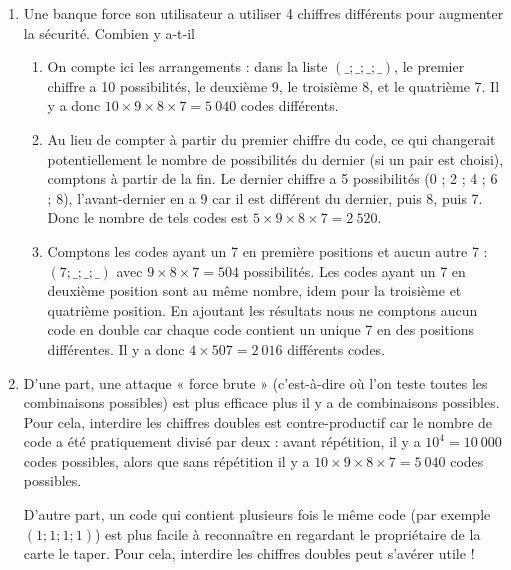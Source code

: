 {\begin{enumerate}
\begin{enumerate}
			\item
			Comptons plutôt les codes ne contenant jamais 7 : il y a en $9^4 = 6~561$ car chaque numéro du code a $9$ possibilités.
			Les codes contenant au moins une fois 7 sont donc au nombre de $10^4 - 9^4 = 3~439$.
			\item
			Comptons les codes ayant un 7 en première positions et aucun autre 7 : $(7 ; \_ ; \_ ; \_)$ avec $9\times9\times9 = 729$ possibilités.
			Les codes ayant un 7 en deuxième position sont au même nombre, idem pour la troisième et quatrième position.
			En ajoutant les résultats nous ne comptons aucun code en double car chaque code contient un unique 7 en des positions différentes.
			Il y a donc $4\times729 = 2~916$ différents codes.
		\end{enumerate}
		\item
		Une banque force son utilisateur a utiliser 4 chiffres différents pour augmenter la sécurité.
		Combien y a-t-il
		\begin{enumerate}
			\item
			On compte ici les arrangements : dans la liste $( \_ ; \_ ; \_ ; \_)$, le premier chiffre a 10 possibilités, le deuxième 9, le troisième 8, et le quatrième 7.
			Il y a donc $10\times9\times8\times7 = 5~040$ codes différents.
			\item
			Au lieu de compter à partir du premier chiffre du code, ce qui changerait potentiellement le nombre de possibilités du dernier (si un pair est choisi), comptons à partir de la fin.
			Le dernier chiffre a 5 possibilités (0 ; 2 ; 4 ; 6 ; 8), l'avant-dernier en a 9 car il est différent du dernier, puis 8, puis 7.
			Donc le nombre de tels codes est $5\times9\times8\times7 = 2~520$.
			\item
			Comptons les codes ayant un 7 en première positions et aucun autre 7 : $(7 ; \_ ; \_ ; \_)$ avec $9\times8\times7 = 504$ possibilités.
			Les codes ayant un 7 en deuxième position sont au même nombre, idem pour la troisième et quatrième position.
			En ajoutant les résultats nous ne comptons aucun code en double car chaque code contient un unique 7 en des positions différentes.
			Il y a donc $4\times507 = 2~016$ différents codes.
		\end{enumerate}
		\item
		D'une part, une attaque « force brute » (c'est-à-dire où l'on teste toutes les combinaisons possibles) est plus efficace plus il y a de combinaisons possibles.
		Pour cela, interdire les chiffres doubles est contre-productif car le nombre de code a été pratiquement divisé par deux : avant répétition, il y a $10^4 = 10~000$ codes possibles, alors que sans répétition il y a $10\times9\times8\times7 = 5~040$ codes possibles.
		
		D'autre part, un code qui contient plusieurs fois le même code (par exemple $(1;1;1;1)$) est plus facile à reconnaître en regardant le propriétaire de la carte le taper.
		Pour cela, interdire les chiffres doubles peut s'avérer utile !
	\end{enumerate}
}

